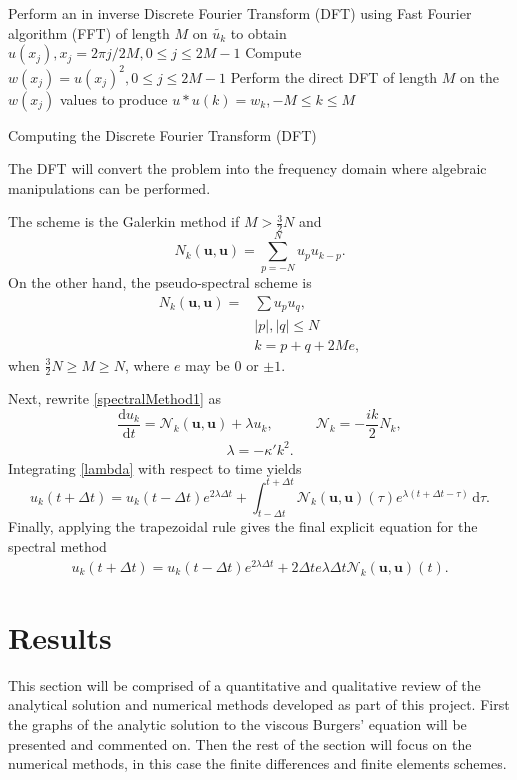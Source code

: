 \documentclass[undefended]{sfuthesis}
\begin{document}
\begin{algorithm}
	Perform an in inverse Discrete Fourier Transform (DFT) using Fast Fourier algorithm (FFT) of length $M$ on $\widetilde{u_k}$ to obtain $u(x_j), x_j = 2 \pi j / 2M, 0 \leq j \leq 2M - 1$\;
	Compute $w(x_j) = u(x_j)^2, 0 \leq j \leq 2M - 1$\;
	Perform the direct DFT of length $M$ on the $w(x_j)$ values to produce $u * u(k) = w_k, - M \leq k \leq M$\;
	\caption{Computing the Discrete Fourier Transform (DFT)}
\end{algorithm}
The DFT will convert the problem into the frequency domain where algebraic manipulations can be performed.

The scheme is the Galerkin method if $M > \frac{3}{2} N$ and \[N_k(\textbf{u}, \textbf{u}) = \sum_{p = - N}^{N} u_p u_{k - p}.\] On the other hand, the pseudo-spectral scheme is
\begin{align*}
N_k(\textbf{u}, \textbf{u}) =& \sum u_pu_q, \\
& |p|, |q| \leq N \\
& k = p + q + 2Me,
\end{align*}
when $\frac{3}{2}N \geq M \geq N$, where $e$ may be 0 or $\pm 1$. 

Next, rewrite \eqref{spectralMethod1} as \[\frac{\mathrm{d} u_k}{\mathrm{d} t} = \mathcal{N}_k (\textbf{u}, \textbf{u})+ \lambda u_k, \quad\quad\quad \mathcal{N}_k = -\frac{ik}{2}N_k,\]
\begin{align} 
\lambda = - \kappa'k^2. \label{lambda}
\end{align}
Integrating \eqref{lambda} with respect to time yields \[u_k(t + \Delta t) = u_k(t - \Delta t) e^{2\lambda \Delta t} + \int_{t - \Delta t}^{t + \Delta t} \mathcal{N}_k(\textbf{u}, \textbf{u})(\tau)e^{\lambda(t + \Delta t - \tau)} \, \mathrm{d} \tau.\] Finally, applying the trapezoidal rule gives the final explicit equation for the spectral method
\begin{align*}
u_k(t + \Delta t) = u_k (t - \Delta t)e^{2 \lambda \Delta t} + 2 \Delta t e{\lambda \Delta t} \mathcal{N}_k (\textbf{u}, \textbf{u})(t).
\end{align*}

\chapter{Results}
\label{sec:results}

This section will be comprised of a quantitative and qualitative review of the analytical solution and numerical methods developed as part of this project. First the graphs of the analytic solution to the viscous Burgers' equation will be presented and commented on. Then the rest of the section will focus on the numerical methods, in this case the finite differences and finite elements schemes.
\end{document}
